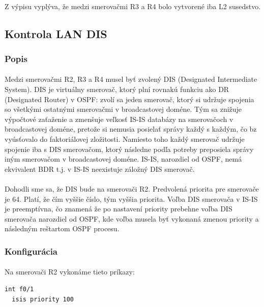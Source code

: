 \documentclass[12pt,twoside,a4paper]{report}
\begin{document}
\paragraph{}
Z výpisu vyplýva, že medzi smerovačmi R3 a R4 bolo vytvorené iba L2 susedstvo.






\subsection{Kontrola LAN DIS}
\label{kontrola_lan_dis}
\subsubsection{Popis}
\paragraph{}
Medzi smerovačmi R2, R3 a R4 musel byť zvolený DIS (Designated Intermediate System). DIS je virtuálny smerovač, ktorý plní rovnakú funkciu ako DR (Designated Router) v OSPF: zvolí sa jeden smerovač, ktorý si udržuje spojenia so všetkými ostatnými smerovačmi v broadcastovej doméne. Tým sa znižuje výpočtové zaťaženie a zmenšuje veľkosť IS-IS databázy na smerovačoch v broadcastovej doméne, pretože si nemusia posielať správy každý s každým, čo bz vyúsťovalo do faktoriálovej zložitosti. Namiesto toho každý smerovač udržuje spojenie iba s DIS smerovačom, ktorý následne podľa potreby preposiela správy iným smerovačom v broadcastovej doméne. IS-IS, narozdiel od OSPF, nemá ekvivalent BDR t.j. v IS-IS neexistuje záložný DIS smerovač.

\paragraph{}
Dohodli sme sa, že DIS bude na smerovači R2. Predvolená priorita pre smerovače je 64. Platí, že čím vyššie číslo, tým vyššia priorita. Voľba DIS smerovača v IS-IS je preemptívna, čo znamená že  po nastavení priority prebehne voľba DIS smerovača narozdiel od OSPF, kde voľba musela byť vykonaná zmenou priority a následným reštartom OSPF procesu.

\subsubsection{Konfigurácia}
\paragraph{}
Na smerovači R2 vykonáme tieto príkazy:
\noindent
{\selectfont
\begin{small}
\begin{verbatim}
int f0/1
  isis priority 100
\end{verbatim}
\end{small}
}
\end{document}
